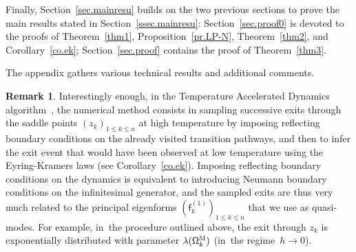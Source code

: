 \documentclass[10pt]{amsart}
\theoremstyle{plain}
\theoremstyle{definition}
\newtheorem{remark}[proposition]{Remark}
\begin{document}
Finally, Section~\ref{sec.mainresu} builds on the two previous sections
to prove the main results stated in Section~\ref{ssec.mainresu}: Section~\ref{sec.proof0} is devoted to the
proofs of Theorem~\ref{thm1}, Proposition~\ref{pr.LP-N},
Theorem~\ref{thm2}, and Corollary~\ref{co.ek}; Section~\ref{sec.proof}
contains the proof of Theorem~\ref{thm3}.

The appendix gathers various technical results and additional comments.

\begin{remark}\label{rem:TAD}
Interestingly enough, in
the Temperature Accelerated Dynamics
algorithm~\cite{sorensen-voter-00,aristoff-lelievre-14,di-gesu-lelievre-le-peutrec-nectoux-17}, the numerical method
consists in sampling successive exits through the saddle points
$(z_k)_{1 \le k \le n}$ at high temperature by imposing reflecting boundary conditions on
the already visited transition pathways, and then to infer the
exit event that would have been observed at low temperature using the
Eyring-Kramers laws (see Corollary~\ref{co.ek}). Imposing reflecting boundary conditions on
the dynamics is
equivalent to introducing Neumann boundary conditions on the
infinitesimal generator, and the sampled exits are thus very much
related to the principal eigenforms $(\mathsf f_k^{(1)})_{1 \le k \le n}$ that we use
as quasi-modes. For example, in~the procedure outlined above, the exit through $z_k$ is exponentially
distributed with parameter $\lambda(\mathsf
\Omega_k^{\textsc{M}})$ (in~the regime~$h \to 0$).
\end{remark}
\end{document}
